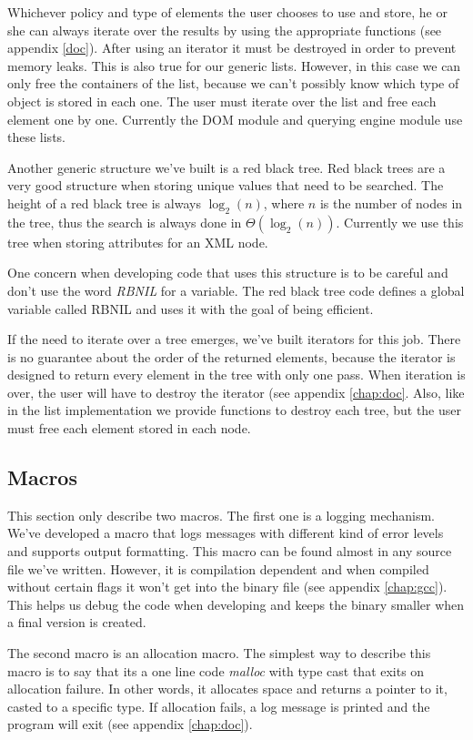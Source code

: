 \documentclass[a4paper]{report}
\begin{document}
		Whichever policy and type of elements the user chooses to use and store, he or she can always iterate over the results by using the appropriate functions (see appendix \ref{doc}). After using an iterator it must be 
		destroyed in order to prevent memory leaks. This is also true for our generic lists. However, in this case we can only free the containers of the list, because we can't possibly know which type of object is stored in each
		one. The user must iterate over the list and free each element one by one. Currently the DOM module and querying engine module use these lists.
		
		Another generic structure we've built is a red black tree. Red black trees are a very good structure when storing unique values that need to be searched. The height of a red black tree is always $\log_2(n)$, where $n$
		is the number of nodes in the tree, thus the search is always done in $\Theta(\log_2(n))$. Currently we use this tree when storing attributes for an XML node.
		
		One concern when developing code that uses this structure is to be careful and don't use the word \emph{RBNIL} for a variable. The red black tree code defines a global variable called RBNIL and uses it with the goal of 
		being efficient.
		
		If the need to iterate over a tree emerges, we've built iterators for this job. There is no guarantee about the order of the returned elements, because the iterator is designed to return every element in the tree with
		only one pass. When iteration is over, the user will have to destroy the iterator (see appendix \ref{chap:doc}. Also, like in the list implementation we provide functions to destroy each tree, but the user must free each
		element stored in each node.
		
	\subsection{Macros}
		This section only describe two macros. The first one is a logging mechanism. We've developed a macro that logs messages with different kind of error levels and supports output formatting. This macro can be found
		almost in any source file we've written. However, it is compilation dependent and when compiled without certain flags it won't get into the binary file (see appendix \ref{chap:gcc}). This helps us debug the code when
		developing and keeps the binary smaller when a final version is created.
		
		The second macro is an allocation macro. The simplest way to describe this macro is to say that its a one line code \emph{malloc} with type cast that exits on allocation failure. In other words, it allocates space and 
		returns a pointer to it, casted to a specific type. If allocation fails, a log message is printed and the program will exit (see appendix \ref{chap:doc}). 
\end{document}
